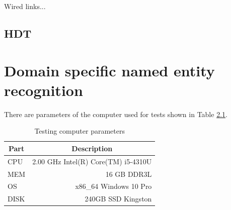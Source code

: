 \documentclass[thesis=M,english]{FITthesis}[2018/05/30]
\begin{document}
Wired links...

\section{HDT}



\chapter{Domain specific named entity recognition}\label{}

There are parameters of the computer used for tests shown in Table \ref{tab:PCparam}.
\begin{table}[H]\centering
	\caption{Testing computer parameters}
	\label{tab:PCparam}
	\begin{tabular}{|l|r|}
	\hline \multicolumn{1}{|c|}{\textbf{Part}} & \multicolumn{1}{|c|}{\textbf{Description}} \\\hline
	CPU & 2.00 GHz Intel(R) Core(TM) i5-4310U \\
	MEM & 16 GB DDR3L\\
	OS & x86\_64 Windows 10 Pro\\
	DISK & 240GB SSD Kingston\\\hline
	\end{tabular}
\end{table}
\end{document}
